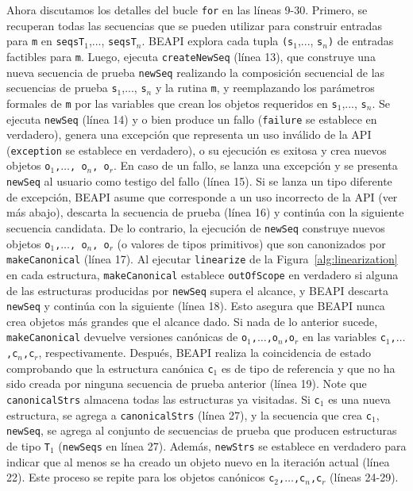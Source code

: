 Ahora discutamos los detalles del bucle \texttt{for} en las líneas 9-30. Primero, se recuperan todas las secuencias que se pueden utilizar para construir entradas para \texttt{m} en \texttt{seqsT$_1$},..., \texttt{seqsT$_n$}. \textsf{BEAPI} explora cada tupla \texttt{(s$_1$},..., \texttt{s$_n$)} de entradas factibles para \texttt{m}. Luego, ejecuta \texttt{createNewSeq} (línea 13), que construye una nueva secuencia de prueba \texttt{newSeq} realizando la composición secuencial de las secuencias de prueba \texttt{s$_1$},..., \texttt{s$_n$} y la rutina \texttt{m}, y reemplazando los parámetros formales de \texttt{m} por las variables que crean los objetos requeridos en \texttt{s$_1$},..., \texttt{s$_n$}. Se ejecuta \texttt{newSeq} (línea 14) y o bien produce un fallo (\texttt{failure} se establece en verdadero), genera una excepción que representa un uso inválido de la API (\texttt{exception} se establece en verdadero), o su ejecución es exitosa y crea nuevos objetos \texttt{o$_1$,$\ldots$, o$_n$, o$_r$}. En caso de un fallo, se lanza una excepción y se presenta \texttt{newSeq} al usuario como testigo del fallo (línea 15). Si se lanza un tipo diferente de excepción, \textsf{BEAPI} asume que corresponde a un uso incorrecto de la API (ver más abajo), descarta la secuencia de prueba (línea 16) y continúa con la siguiente secuencia candidata. De lo contrario, la ejecución de \texttt{newSeq} construye nuevos objetos \texttt{o$_1$,$\ldots$, o$_n$, o$_r$} (o valores de tipos primitivos) que son canonizados por \texttt{makeCanonical} (línea 17). Al ejecutar \texttt{linearize} de la Figura~\ref{alg:linearization} en cada estructura, \texttt{makeCanonical} establece \texttt{outOfScope} en verdadero si alguna de las estructuras producidas por \texttt{newSeq} supera el alcance, y \textsf{BEAPI} descarta \texttt{newSeq} y continúa con la siguiente (línea 18). Esto asegura que \textsf{BEAPI} nunca crea objetos más grandes que el alcance dado. Si nada de lo anterior sucede, \texttt{makeCanonical} devuelve versiones canónicas de \texttt{o$_1$,$\ldots$,o$_n$,o$_r$} en las variables \texttt{c$_1$,$\ldots$,c$_n$,c$_r$}, respectivamente. Después, \textsf{BEAPI} realiza la coincidencia de estado comprobando que la estructura canónica \texttt{c$_1$} es de tipo de referencia y que no ha sido creada por ninguna secuencia de prueba anterior (línea 19). Note que \texttt{canonicalStrs} almacena todas las estructuras ya visitadas. Si \texttt{c$_1$} es una nueva estructura, se agrega a \texttt{canonicalStrs} (línea 27), y la secuencia que crea \texttt{c$_1$}, \texttt{newSeq}, se agrega al conjunto de secuencias de prueba que producen estructuras de tipo \texttt{T$_1$} (\texttt{newSeqs} en línea 27). Además, \texttt{newStrs} se establece en verdadero para indicar que al menos se ha creado un objeto nuevo en la iteración actual (línea 22). Este proceso se repite para los objetos canónicos \texttt{c$_2$,$\ldots$,c$_n$,c$_r$} (líneas 24-29).

